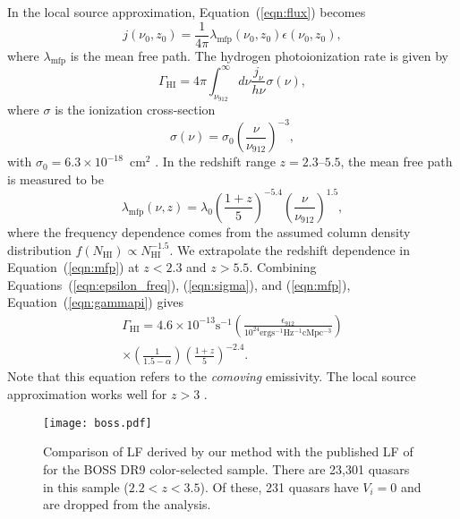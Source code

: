 \documentclass[a4paper,fleqn,usenatbib]{mnras}
\begin{document}
In the local source approximation, Equation~(\ref{eqn:flux}) becomes
\begin{equation}
  j(\nu_0, z_0) = \frac{1}{4\pi}\lambda_\mathrm{mfp}(\nu_0, z_0)\epsilon(\nu_0, z_0),
\end{equation}
where $\lambda_\mathrm{mfp}$ is the mean free path.  The hydrogen
photoionization rate is given by
\begin{equation}
  \Gamma_\mathrm{HI}=4\pi\int_{\nu_{912}}^\infty d\nu \frac{j_\nu}{h\nu} \sigma(\nu),
  \label{eqn:gammapi}
\end{equation}
where $\sigma$ is the ionization cross-section
\begin{equation}
  \sigma(\nu) = \sigma_0\left(\frac{\nu}{\nu_{912}}\right)^{-3},
  \label{eqn:sigma}
\end{equation}
with $\sigma_0=6.3\times 10^{-18}$~cm$^2$ \citep{2006agna.book.....O}.
In the redshift range $z=2.3$--$5.5$, the mean free path is measured
to be \citep{2014MNRAS.445.1745W}
\begin{equation}
  \lambda_\mathrm{mfp}(\nu, z)= \lambda_0\left(\frac{1+z}{5}\right)^{-5.4}\left(\frac{\nu}{\nu_{912}}\right)^{1.5},
  \label{eqn:mfp}
\end{equation}
where the frequency dependence comes from the assumed column density
distribution $f(N_\mathrm{HI})\propto N_\mathrm{HI}^{-1.5}$.  We
extrapolate the redshift dependence in Equation~(\ref{eqn:mfp}) at
$z<2.3$ and $z>5.5$.  Combining Equations~(\ref{eqn:epsilon_freq}),
(\ref{eqn:sigma}), and (\ref{eqn:mfp}), Equation~(\ref{eqn:gammapi})
gives
\begin{multline}
  \Gamma_\mathrm{HI}=4.6\times 10^{-13} \mathrm{s}^{-1} \left(\frac{\epsilon_{912}}{10^{24}\mathrm{erg s^{-1} Hz^{-1} cMpc^{-3}}}\right)\\
  \times\left(\frac{1}{1.5-\alpha}\right)\left(\frac{1+z}{5}\right)^{-2.4}.
\end{multline}
Note that this equation refers to the \emph{comoving} emissivity.  The
local source approximation works well for $z>3$ \citep{2013MNRAS.436.1023B}.




\begin{figure*}
  \begin{center}
    \texttt{[image: boss.pdf]}
  \end{center}
  \caption{Comparison of LF derived by our method with the published
    LF of \citet{2013ApJ...773...14R} for the BOSS DR9 color-selected
    sample. There are 23,301 quasars in this sample ($2.2<z<3.5$).  Of
    these, 231 quasars have $V_i=0$ and are dropped from the
    analysis.}
  \label{fig:boss}
\end{figure*}
\end{document}
